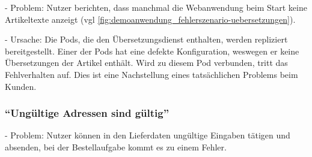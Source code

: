 - Problem: Nutzer berichten, dass manchmal die Webanwendung beim Start keine Artikeltexte anzeigt (vgl \autoref{fig:demoanwendung_fehlerszenario-uebersetzungen}).

- Ursache: Die Pods, die den Übersetzungsdienst enthalten, werden repliziert bereitgestellt. Einer der Pods hat eine defekte Konfiguration, weswegen er keine Übersetzungen der Artikel enthält. Wird zu diesem Pod verbunden, tritt das Fehlverhalten auf. Dies ist eine Nachstellung eines tatsächlichen Problems beim Kunden.

%
%

%
%

%
%

\subsubsection{\enquote{Ungültige Adressen sind gültig}}
\label{subsec:ungueltige-adressen-sind-gueltig}

- Problem: Nutzer können in den Lieferdaten ungültige Eingaben tätigen und absenden, bei der Bestellaufgabe kommt es zu einem Fehler.

